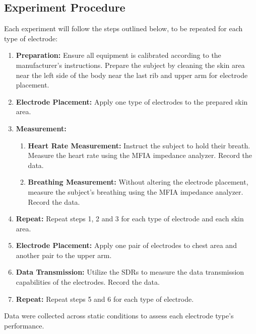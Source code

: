 \documentclass[conference]{IEEEtran}
\newcommand{\notea}[1]{\textcolor{blue}{Armands: #1}}
\begin{document}
\subsection{Experiment Procedure}
Each experiment will follow the steps outlined below, to be repeated for each type of electrode:

\begin{enumerate}
    \item \textbf{Preparation:} Ensure all equipment is calibrated according to the manufacturer's instructions. Prepare the subject by cleaning the skin area near the left side of the body near the last rib and upper arm for electrode placement.
    \item \textbf{Electrode Placement:} Apply one type of electrodes to the prepared skin area.
    \item \textbf{Measurement:}
    \begin{enumerate}
        \item \textbf{Heart Rate Measurement:} Instruct the subject to hold their breath. Measure the heart rate using the MFIA impedance analyzer. Record the data.
        \item \textbf{Breathing Measurement:} Without altering the electrode placement, measure the subject's breathing using the MFIA impedance analyzer. Record the data.
        
    \end{enumerate}

    \item \textbf{Repeat:} Repeat steps 1, 2 and 3 for each type of electrode and each skin area.
    \item \textbf{Electrode Placement:} Apply one pair of electrodes to chest area and another pair to the upper arm.
    \item \textbf{Data Transmission:} Utilize the SDRs to measure the data transmission capabilities of the electrodes. Record the data.
    \item \textbf{Repeat:} Repeat steps 5 and 6 for each type of electrode.
\end{enumerate}

Data were collected across static conditions to assess each electrode type's performance.




    
\end{document}
